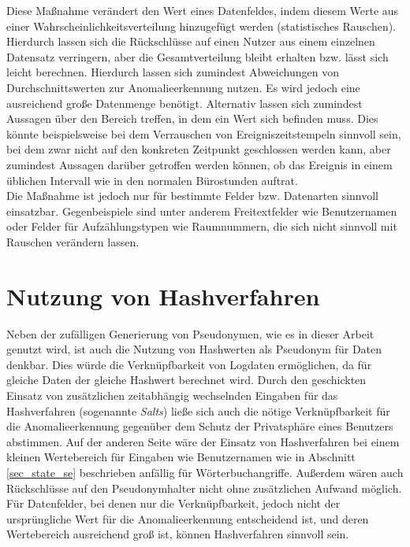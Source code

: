 Diese Maßnahme verändert den Wert eines Datenfeldes, indem diesem Werte aus einer Wahrscheinlichkeitsverteilung hinzugefügt werden (statistisches Rauschen). Hierdurch lassen sich die Rückschlüsse auf einen Nutzer aus einem einzelnen Datensatz verringern, aber die Gesamtverteilung bleibt erhalten bzw. lässt sich leicht berechnen. Hierdurch lassen sich zumindest Abweichungen von Durchschnittswerten zur Anomalieerkennung nutzen. Es wird jedoch eine ausreichend große Datenmenge benötigt. Alternativ lassen sich zumindest Aussagen über den Bereich treffen, in dem ein Wert sich befinden muss. Dies könnte beispielsweise bei dem Verrauschen von Ereigniszeitstempeln sinnvoll sein, bei dem zwar nicht auf den konkreten Zeitpunkt geschlossen werden kann, aber zumindest Aussagen darüber getroffen werden können, ob das Ereignis in einem üblichen Intervall wie in den normalen Bürostunden auftrat.\\
Die Maßnahme ist jedoch nur für bestimmte Felder bzw. Datenarten sinnvoll einsatzbar. Gegenbeispiele sind unter anderem Freitextfelder wie Benutzernamen oder Felder für Aufzählungstypen wie Raumnummern, die sich nicht sinnvoll mit Rauschen verändern lassen. 

\section{Nutzung von Hashverfahren}

Neben der zufälligen Generierung von Pseudonymen, wie es in dieser Arbeit genutzt wird, ist auch die Nutzung von Hashwerten als Pseudonym für Daten denkbar. Dies würde die Verknüpfbarkeit von Logdaten ermöglichen, da für gleiche Daten der gleiche Hashwert berechnet wird. Durch den geschickten Einsatz von zusätzlichen zeitabhängig wechselnden Eingaben für das Hashverfahren (sogenannte \textit{Salts}) ließe sich auch die nötige Verknüpfbarkeit für die Anomalieerkennung gegenüber dem Schutz der Privatsphäre eines Benutzers abstimmen. Auf der anderen Seite wäre der Einsatz von Hashverfahren bei einem kleinen Wertebereich für Eingaben wie Benutzernamen wie in Abschnitt \ref{sec_state_se} beschrieben anfällig für Wörterbuchangriffe. Außerdem wären auch Rückschlüsse auf den Pseudonymhalter nicht ohne zusätzlichen Aufwand möglich.\\
Für Datenfelder, bei denen nur die Verknüpfbarkeit, jedoch nicht der ursprüngliche Wert für die Anomalieerkennung entscheidend ist, und deren Wertebereich ausreichend groß ist, können Hashverfahren sinnvoll sein. 

